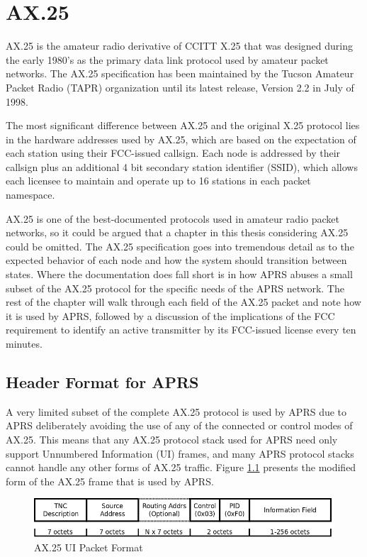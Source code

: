 \chapter{AX.25}

AX.25 is the amateur radio derivative of CCITT X.25 that was designed during the early 1980's 
as the primary data link protocol used by amateur packet networks.
The AX.25 specification has been maintained by the Tucson Amateur Packet Radio (TAPR) 
organization until its latest release, Version 2.2 in July of 1998. 

The most significant difference between AX.25 and the original X.25 protocol lies
in the hardware addresses used by AX.25, which are based on the expectation of
each station using their FCC-issued callsign. 
Each node is addressed by their callsign plus an additional 4 bit 
secondary station identifier (SSID), which allows each licensee to maintain and operate 
up to 16 stations in each packet namespace.

AX.25 is one of the best-documented protocols used in amateur radio packet networks,
so it could be argued that a chapter in this thesis considering AX.25 could be omitted.
The AX.25 specification goes into tremendous detail as to the expected behavior of each
node and how the system should transition between states.
Where the documentation does fall short is in how APRS abuses a small subset of 
the AX.25 protocol for the specific needs of the APRS network.
The rest of the chapter will walk through each field of the AX.25 packet and
note how it is used by APRS, followed by a discussion of the implications of the FCC
requirement to identify an active transmitter by its FCC-issued license every ten minutes.

\section{Header Format for APRS}

A very limited subset of the complete AX.25 protocol is used by APRS due to APRS 
deliberately avoiding the use of any of the connected or control modes of AX.25. This 
means that any AX.25 protocol stack used for APRS need only support Unnumbered Information (UI)
frames, and many APRS protocol stacks cannot handle any other forms of AX.25 traffic. 
Figure \ref{fig:ax25uiformat} presents the modified form of the AX.25 frame that is used
by APRS.

\begin{figure}
	\centering
	\includegraphics[width=1.0\textwidth]{src/dia/ax25ui}
	\caption{AX.25 UI Packet Format}
	\label{fig:ax25uiformat}
\end{figure}

